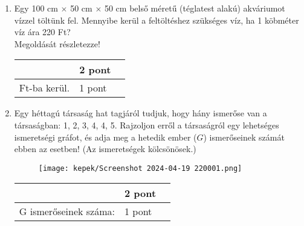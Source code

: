 \documentclass[12pt,a4paper]{article}
\begin{document}
\begin{enumerate}[leftmargin=*,label=\textbf{\large\arabic*.}]
    \item
    Egy 100 cm \(\times\) 50 cm \(\times\) 50 cm belső méretű (téglatest alakú) akváriumot vízzel töltünk fel.
Mennyibe kerül a feltöltéshez szükséges víz, ha 1 köbméter víz ára 220 Ft? \\
Megoldását részletezze! 
    \vspace{4cm}
    
    \begin{flushright}
        \begin{tabular}{|>{\raggedleft}M{6cm}|M{2cm}|M{2cm}|}
         \
         & 
        \vspace{20pt}
         2 pont  &  \\[30pt]
        \hline
        \vspace{20pt}
        Ft-ba kerül. 
        & 
        \vspace{20pt}
         1 pont  &  \\[30pt]
        \hline
        \end{tabular}
    \end{flushright}


    \item
Egy héttagú társaság hat tagjáról tudjuk, hogy hány ismerőse van a társaságban: 1, 2, 3,
4, 4, 5. Rajzoljon erről a társaságról egy lehetséges ismeretségi gráfot, és adja meg a hetedik ember (\(G\)) ismerőseinek számát ebben az esetben! (Az ismeretségek kölcsönösek.) 
    \begin{figure}[h]
        \centering
        \texttt{[image: kepek/Screenshot 2024-04-19 220001.png]}
    \end{figure}

\vspace{\fill}

    \begin{flushright}
        \begin{tabular}{|>{\raggedright}M{6cm}|M{2cm}|M{2cm}|}
         \
         & 
        \vspace{20pt}
         2 pont  &  \\[30pt]
        \hline
        \vspace{20pt}
        G ismerőseinek száma: 
        & 
        \vspace{20pt}
         1 pont  &  \\[30pt]
        \hline
        \end{tabular}
    \end{flushright}


\end{enumerate}
\end{document}
